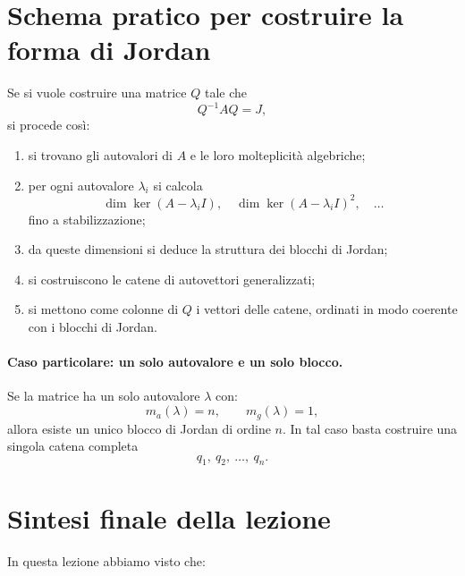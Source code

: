 \section{Schema pratico per costruire la forma di Jordan}

Se si vuole costruire una matrice $Q$ tale che
\[
Q^{-1}AQ=J,
\]
si procede così:

\begin{enumerate}
    \item si trovano gli autovalori di $A$ e le loro molteplicità algebriche;
    \item per ogni autovalore $\lambda_i$ si calcola
    \[
    \dim\ker(A-\lambda_i I),
    \quad
    \dim\ker(A-\lambda_i I)^2,
    \quad \dots
    \]
    fino a stabilizzazione;
    \item da queste dimensioni si deduce la struttura dei blocchi di Jordan;
    \item si costruiscono le catene di autovettori generalizzati;
    \item si mettono come colonne di $Q$ i vettori delle catene, ordinati in modo coerente con i blocchi di Jordan.
\end{enumerate}

\paragraph{Caso particolare: un solo autovalore e un solo blocco.}
Se la matrice ha un solo autovalore $\lambda$ con:
\[
m_a(\lambda)=n,\qquad m_g(\lambda)=1,
\]
allora esiste un unico blocco di Jordan di ordine $n$.  
In tal caso basta costruire una singola catena completa
\[
q_1,\ q_2,\ \dots,\ q_n.
\]

\section{Sintesi finale della lezione}

In questa lezione abbiamo visto che:

